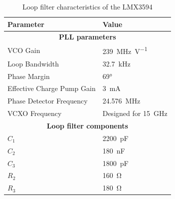 \begin{table}[tb]
	\caption[LMX2594 loop filter characteristics]{Loop filter characteristics of the LMX3594}
	\label{tab:lmx2594_filter}
	\centering
	\begin{tabularx}{\textwidth}{Xl}
		\toprule
		\textbf{Parameter}                         & \textbf{Value}             \\ 
		\midrule
		\multicolumn{2}{c}{\textbf{PLL parameters}}                             \\
		VCO Gain                                   & \SI{239}{\MHz\per\volt}    \\
		Loop Bandwidth                             & \SI{32.7}{\kHz}            \\
		Phase Margin                               & \ang{69}                   \\
		Effective Charge Pump Gain                 & \SI{3}{\milli\ampere}      \\
		Phase Detector Frequency                   & \SI{24.576}{\MHz}          \\
		VCXO Frequency                             & Designed for \SI{15}{\GHz} \\
		[0.3cm]
		\multicolumn{2}{c}{\textbf{Loop filter components}}   \\                        
		$C_{1}$                          & \SI{2200}{\pico\farad}     \\
		$C_{2}$                          & \SI{180}{\nano\farad}      \\
		$C_{3}$                          & \SI{1800}{\pico\farad}     \\
		$R_{2}$                                    & \SI{160}{\ohm}             \\
		$R_{3}$                          & \SI{180}{\ohm}             \\ \bottomrule
	\end{tabularx}
\end{table}



